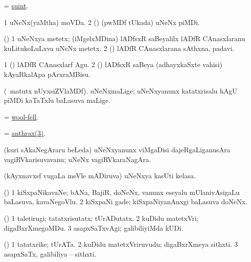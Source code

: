 \bentry
{} 
\gl{\nA}
\expl{}
\bmng
= \hyperref{kandict_s.pdf}{S}{suint}{suint}. 
\emng
\eentry

\bentry
{} 
\gl{\nA}
\expl{}
\bmng
\bnum
\num{1} uNeNx(yaMtha) moVDa. 
\num{2} (\ca) (pwMDf tUkada) uNeNx piMDi. 
\enum
\emng
\eentry

\bentry
{} 
\gl{\nA}
\expl{}
\bmng
(\birx) 
\bnum
\num{1} uNeNxya metetx; (iMgelxMDina) lADfsxR saBeyalilx lADfR CAnasxlaranu kuLitukoLuLxva uNeNx metetx. 
\num{2} (\birx) lADfR CAnasxlarana sAthxna, padavi. 
\enum
\emng

\noindent
\gl{\pagu}
\expl{}
\bmng
\bnum
\num{1}  (\birx) lADfR CAnasxlarf Agu. 
\num{2}  (\birx) lADfsxR saBeya (adhayxkaSxte vahisi) kAyaRkalApa pArxraMBisu. 
\enum
\emng
\eentry

\bentry
{} 
\gl{\nA}
\expl{}
\bmng
(\AseTxrXV\ matutx nUyxsiZVlaMDf). uNeNxmaLige; uNeNxyanunx katatxrisalu hAgU piMDi kaTaTxlu baLasuva maLige. 
\emng
\eentry

\bentry 
{} 
\gl{\nA}
\expl{}
\bmng
= \hyperlink{wool-fell}{wool-fell}. 
\emng
\eentry

\bentry
{}
\gl{\nA}
\expl{}
\bmng
= \hyperref{kandict_a.pdf}{A}{anthrax(3)}{anthrax(3)}. 
\emng
\eentry

\bentry
{} 
\gl{\nA}
\expl{}
\bmng
(kuri sAkaNegAraru beLeda) uNeNxyanunx viMgaDisi dajeRgaLiganusAra vagiRVkarisuvavanu; uNeNx vagiRVkaraNagAra. 
\emng
\eentry

\bentry
{} 
\gl{\nA}
\expl{}
\bmng
(kAyxnavxsf \mo vugaLa meVle mADiruva) uNeNxya kasUti kelasa. 
\emng
\eentry

\bentry
{} 
\gl{\nA}
\expl{}
\bmng
(\AseTxrXV) 
\bnum
\num{1} kiSxpaNikavaNe; bANa, BajiR, doNeNx, \mo vanunx eseyalu mUlanivAsigaLu baLasuva, kavaNegoVlu. 
\num{2} kiSxpaNi gade; kiSxpaNiyanAnxgi baLasuva doNeNx. 
\enum
\emng
\eentry

\bentry
{} 
\gl{\kirxvi}
\expl{}
\bmng
(\AmA) 
\bnum
\num{1} taletirugi; tatatxrisutatx; tUrADutatx. 
\num{2} kuDidu matetxVri; digaBxrXmegoMDu. 
\num{3} asapxSaTxvAgi; galibiliyiMda kUDi. 
\enum
\emng
\eentry

\bentry
{} 
\gl{\nA}
\expl{}
\bmng
(\AmA) 
\bnum
\num{1} tatatxrike; tUrATa. 
\num{2} kuDidu matetxVriruvudu; digaBxrXmeya sithxti. 
\num{3} asapxSaTx, galibiliya -- sithxti. 
\enum
\emng
\eentry

